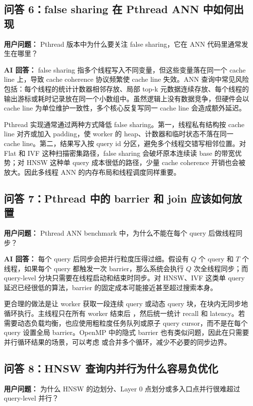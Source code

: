 \documentclass[11pt,a4paper]{article}
\newcommand{\code}[1]{\texttt{\detokenize{#1}}}
\begin{document}
\subsection*{问答 6：false sharing 在 Pthread ANN 中如何出现}
\noindent\textbf{用户问题：} Pthread 版本中为什么要关注 false sharing，它在 ANN 代码里通常发生在哪里？

\noindent\textbf{AI 回答：} false sharing 指多个线程写入不同变量，但这些变量落在同一个 cache line 上，导致 cache coherence 协议频繁使 cache line 失效。ANN 查询中常见风险包括：每个线程的统计计数器相邻存放、局部 top-k 元数据连续存放、每个线程的输出游标或耗时记录放在同一个小数组中。虽然逻辑上没有数据竞争，但硬件会以 cache line 为单位维护一致性，多个核心反复写同一 cache line 会造成额外延迟。

Pthread 实现通常通过两种方式降低 false sharing。第一，线程私有结构按 cache line 对齐或加入 padding，使 worker 的 heap、计数器和临时状态不落在同一 cache line。第二，结果写入按 query id 分区，避免多个线程交错写相邻位置。对 Flat 和 IVF 这种扫描密集路径，false sharing 会破坏原本连续读 base 的带宽优势；对 HNSW 这种单 query 成本很低的路径，少量 cache coherence 开销也会被放大。因此多线程 ANN 的内存布局和线程调度同样重要。

\subsection*{问答 7：Pthread 中的 barrier 和 join 应该如何放置}
\noindent\textbf{用户问题：} Pthread ANN benchmark 中，为什么不能在每个 query 后做线程同步？

\noindent\textbf{AI 回答：} 每个 query 后同步会把并行粒度压得过细。假设有 $Q$ 个 query 和 $T$ 个线程，如果每个 query 都触发一次 barrier，那么系统会执行 $Q$ 次全线程同步；而 query-level 分块只需要在线程启动和结束时同步。对 HNSW、IVF 这类单 query 延迟已经很低的算法，barrier 的固定成本可能接近甚至超过搜索本身。

更合理的做法是让 worker 获取一段连续 query 或动态 query 块，在块内无同步地循环执行。主线程只在所有 worker 结束后 \code{pthread\_join}，然后统一统计 recall 和 latency。若需要动态负载均衡，也应使用粗粒度任务队列或原子 query cursor，而不是在每个 query 设置全局 barrier。OpenMP 中的隐式 barrier 也有类似问题，因此在只需要并行循环结果的场景，可以考虑 \code{nowait} 或合并多个循环，减少不必要的同步边界。

\subsection*{问答 8：HNSW 查询内并行为什么容易负优化}
\noindent\textbf{用户问题：} 为什么 HNSW 的边划分、Layer 0 点划分或多入口点并行很难超过 query-level 并行？
\end{document}
